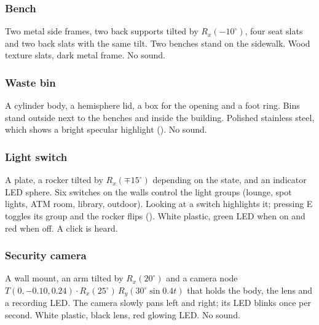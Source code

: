 \subsubsection{Bench}
 Two metal side frames, two back supports tilted by $R_x(-10^\circ)$, four seat slats and
two back slats with the same tilt. Two benches stand on the sidewalk.
 Wood texture slats, dark metal frame. No sound.

\subsubsection{Waste bin}
 A cylinder body, a hemisphere lid, a box for the opening and a foot ring. Bins stand
outside next to the benches and inside the building.
 Polished stainless steel, which shows a bright specular highlight
(). No sound.

\subsubsection{Light switch}
 A plate, a rocker tilted by $R_x(\mp15^\circ)$ depending on the state, and an indicator
LED sphere.
 Six switches on the walls control the light groups (lounge, spot lights, ATM room,
library, outdoor). Looking at a switch highlights it; pressing E toggles its group and the rocker flips
().
 White plastic, green LED when on and red when off. A click is heard.

\subsubsection{Security camera}
 A wall mount, an arm tilted by $R_x(20^\circ)$ and a camera node
$T(0,-0.10,0.24)\cdot R_x(25^\circ)\,R_y(30^\circ\sin 0.4t)$ that holds the body, the lens and a recording LED.
 The camera slowly pans left and right; its LED blinks once per second.
 White plastic, black lens, red glowing LED. No sound.

